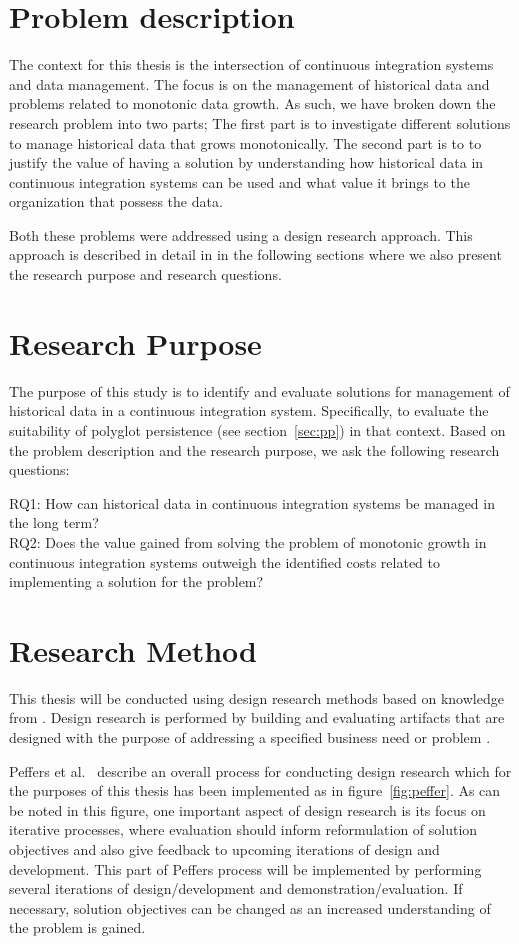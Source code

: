 \section{Problem description}
The context for this thesis is the intersection of continuous integration systems and data management. The focus is on the management of historical data and problems related to monotonic data growth. As such, we have broken down the research problem into two parts; The first part is to investigate different solutions to manage historical data that grows monotonically. The second part is to to justify the value of having a solution by understanding how historical data in continuous integration systems can be used and what value it brings to the organization that possess the data. 

Both these problems were addressed using a design research approach. This approach is described in detail in in the following sections where we also present the research purpose and research questions.

\section{Research Purpose}
The purpose of this study is to identify and evaluate solutions for management of historical data in a continuous integration system. Specifically, to evaluate the suitability of polyglot persistence (see section~\ref{sec:pp}) in that context. Based on the problem description and the research purpose, we ask the following research questions:

RQ1: How can historical data in continuous integration systems be managed in the long term? \\
RQ2: Does the value gained from solving the problem of monotonic growth in continuous integration systems outweigh the identified costs related to implementing a solution for the problem? \\

\section{Research Method}
This thesis will be conducted using design research methods based on knowledge from \cite{DS, Peffers, DesignEval}. Design research is performed by building and evaluating artifacts that are designed with the purpose of addressing a specified business need or problem \cite{DS}. 

Peffers et al.\ \cite{Peffers} describe an overall process for conducting design research which for the purposes of this thesis has been implemented as in figure~\ref{fig:peffer}. As can be noted in this figure, one important aspect of design research is its focus on iterative processes, where evaluation should inform reformulation of solution objectives and also give feedback to upcoming iterations of design and development. This part of Peffers process will be implemented by performing several iterations of design/development and demonstration/evaluation. If necessary, solution objectives can be changed as an increased understanding of the problem is gained. 

